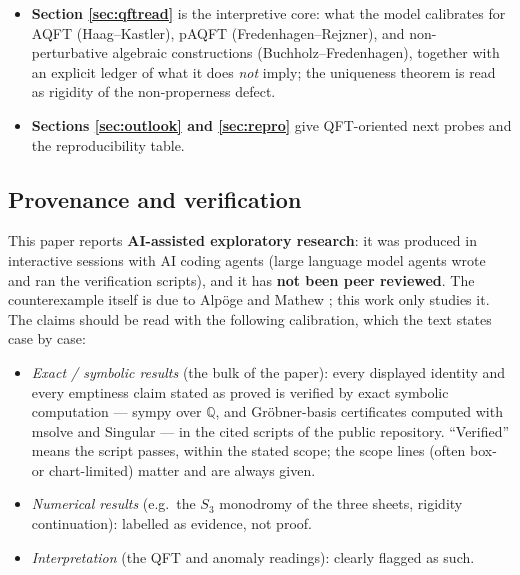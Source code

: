 \documentclass[11pt]{article}
\theoremstyle{definition}
\theoremstyle{remark}
\newcommand{\C}{\mathbb{C}}
\newcommand{\Q}{\mathbb{Q}}
\begin{document}
\begin{itemize}
 relation survives and forces the bundle of fiber algebras
 $A_J=\C[x,y,z]/(F-J)$, in which the wall is the rank-jump locus and
 pole divisor, the $1\leftrightarrow3$ count is the character count,
 and $S_3$ is the transport holonomy (with provably \emph{no} deck
 action); any sector-resolving $S(J)$ is multi-valued or singular on
 the wall.
\item \textbf{Section \ref{sec:qftread}} is the interpretive core: what
 the model calibrates for AQFT (Haag--Kastler), pAQFT
 (Fredenhagen--Rejzner), and non-perturbative algebraic constructions
 (Buchholz--Fredenhagen), together with an explicit ledger of what it
 does \emph{not} imply; the uniqueness theorem is read as rigidity of
 the non-properness defect.
\item \textbf{Sections \ref{sec:outlook} and \ref{sec:repro}} give
 QFT-oriented next probes and the reproducibility table.
\end{itemize}

\subsection{Provenance and verification}\label{sec:provenance}

This paper reports \textbf{AI-assisted exploratory research}: it was
produced in interactive sessions with AI coding agents (large language
model agents wrote and ran the verification scripts), and it has
\textbf{not been peer reviewed}. The counterexample itself is due to
Alp\"oge and Mathew \cite{AM26}; this work only studies it. The claims
should be read with the following calibration, which the text states
case by case:

\begin{itemize}
\item \emph{Exact / symbolic results} (the bulk of the paper): every
 displayed identity and every emptiness claim stated as proved is
 verified by exact symbolic computation --- sympy \cite{sympy} over
 $\Q$, and Gr\"obner-basis certificates computed with msolve
 \cite{msolve} and Singular \cite{Singular} --- in the cited scripts of
 the public repository. ``Verified'' means the script passes, within
 the stated scope; the scope lines (often box- or chart-limited)
 matter and are always given.
\item \emph{Numerical results} (e.g.\ the $S_3$ monodromy of the three
 sheets, rigidity continuation): labelled as evidence, not proof.
\item \emph{Interpretation} (the QFT and anomaly readings): clearly
 flagged as such.
\end{itemize}
\end{document}
